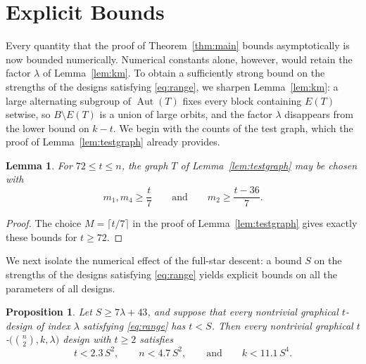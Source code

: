 \documentclass[12pt]{amsart}
\newtheorem{lemma}[theorem]{Lemma}
\newtheorem{proposition}[theorem]{Proposition}
\theoremstyle{definition}
\DeclareMathOperator{\Aut}{Aut}
\begin{document}
\section{Explicit Bounds}
\label{sec:explicitsec}

Every quantity that the proof of Theorem~\ref{thm:main} bounds
asymptotically is now bounded numerically. Numerical constants alone,
however, would retain the factor $\lambda$ of Lemma~\ref{lem:km}. To obtain
a sufficiently strong bound on the strengths of the designs satisfying
\eqref{eq:range}, we sharpen Lemma~\ref{lem:km}: a large alternating
subgroup of $\Aut(T)$ fixes every block containing $E(T)$ setwise, so $B
\setminus E(T)$ is a union of large orbits, and the factor $\lambda$
disappears from the lower bound on $k - t$. We begin with the counts of the
test graph, which the proof of Lemma~\ref{lem:testgraph} already provides.

\begin{lemma}
\label{lem:testgraph2}
For $72 \leq t \leq n$, the graph $T$ of Lemma~\ref{lem:testgraph} may be
chosen with
\[
m_1, m_4 \geq \frac{t}{7}
\qquad \text{and} \qquad
m_2 \geq \frac{t - 36}{7}.
\]
\end{lemma}

\begin{proof}
The choice $M = \lceil t/7 \rceil$ in the proof of Lemma~\ref{lem:testgraph}
gives exactly these bounds for $t \geq 72$.
\end{proof}

We next isolate the numerical effect of the full-star descent: a bound $S$
on the strengths of the designs satisfying \eqref{eq:range} yields explicit
bounds on all the parameters of all designs.

\begin{proposition}
\label{prop:transfer}
Let $S \geq 7\lambda + 43$, and suppose that every nontrivial graphical
$t$-design of index $\lambda$ satisfying \eqref{eq:range} has $t < S$. Then
every nontrivial graphical $t$-$\bigl(\binom{n}{2}, k, \lambda\bigr)$ design
with $t \geq 2$ satisfies
\[
t < 2.3\, S^2,
\qquad
n < 4.7\, S^2,
\qquad \text{and} \qquad
k < 11.1\, S^4.
\]
\end{proposition}
\end{document}
